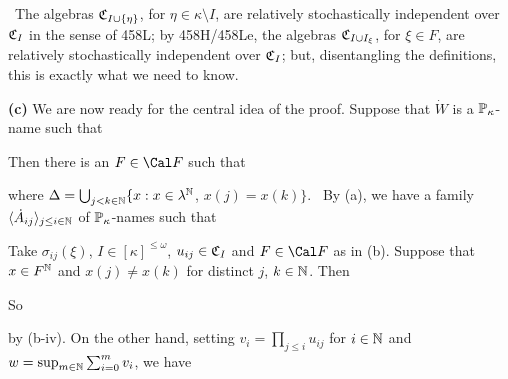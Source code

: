 {\noindent\Prf\ The algebras $\frak C_{I\cup\{\eta\}}$, for
$\eta\in\kappa\setminus I$, are relatively stochastically independent over
$\frak C_I$ in the sense of 458L;  by 458H/458Le, the algebras
$\frak C_{I\cup I_{\xi}}$, for $\xi\in F$, are relatively stochastically
independent over $\frak C_I$;  but, disentangling the definitions, this is
exactly what we need to know.\ \Qed

\medskip

{\bf (c)} We are now ready for the central idea of the proof.
Suppose that $\dot W$ is a $\Bbb P_{\kappa}$-name such that


\noindent Then there is an $F\in\Cal F$ such that


\noindent where
$\Delta=\bigcup_{j<k\in\Bbb N}\{x:x\in\lambda^{\Bbb N}$, $x(j)=x(k)\}$.
\Prf\ By (a), we have a family
$\langle\dot A_{ij}\rangle_{j\le i\in\Bbb N}$ of $\Bbb P_{\kappa}$-names
such that




\noindent Take $\sigma_{ij}(\xi)$, $I\in[\kappa]^{\le\omega}$,
$u_{ij}\in\frak C_I$ and $F\in\Cal F$ as in (b).   Suppose that
$x\in F^{\Bbb N}$ and $x(j)\ne x(k)$ for distinct $j$, $k\in\Bbb N$.   Then


\noindent So


\noindent by (b-iv).   On the other hand, setting
$v_i=\prod_{j\le i}u_{ij}$ for $i\in\Bbb N$
and $w=\sup_{m\in\Bbb N}\sum_{i=0}^mv_i$, we have

}

